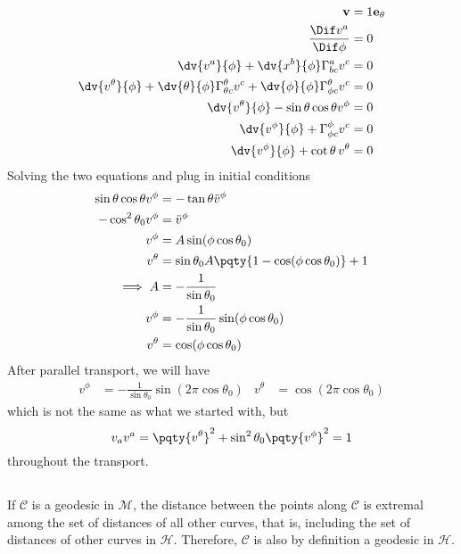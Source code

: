 \documentclass[12pt]{article}
\begin{document}
    \subsubsection{} {
    \begin{align*}
        \bf v &=  1 \bf e_\theta\\
        \frac{\Dif v^a}{\Dif \phi} &=  0\\
        \dv{v^a}{\phi} + \dv{x^b}{\phi}\Gamma^{a}_{bc}v^c &=  0\\
        \dv{v^\theta }{\phi} + \dv{\theta }{\phi}\Gamma^{\theta}_{\theta c}v^c + \dv{\phi }{\phi}\Gamma^{\theta }_{\phi c}v^c &=  0\\
        \dv{v^\theta }{\phi} - \sin\theta \cos\theta v^\phi  &=  0\\
        \dv{v^\phi }{\phi}+ \Gamma^{\phi }_{\phi c}v^c &=  0\\
        \dv{v^\phi}{\phi} + \cot \theta\, v^\theta   &=  0
    \end{align*}}
    Solving the two equations and plug in initial conditions \begin{align*}
        \sin\theta \cos\theta v^\phi &= - \tan\theta \ddot{v}^\phi \\
        -\cos^2\theta_0 v^\phi &= \ddot{v}^\phi \\
        v^\phi &= A \sin(\phi \cos\theta_0)\\
        {v^\theta } &= \sin\theta_0 A\pqty{1 -\cos(\phi \cos\theta_0)}  + 1 \\
        \implies A &= - \frac{1}{\sin\theta_0}\\
        v^\phi &= -\frac{1}{\sin\theta_0} \sin(\phi \cos\theta_0)\\
        {v^\theta } &= \cos(\phi \cos\theta_0)
    \end{align*}
    After parallel transport, we will have \begin{align*}
        v^\phi &= -\frac{1}{\sin\theta_0} \sin(2\pi \cos\theta_0)&
        {v^\theta } &= \cos(2\pi\cos\theta_0)
    \end{align*}
    which is not the same as what we started with, but \[
        v_a v^a =\pqty{v^\theta  }^2 + \sin^2\theta_0\pqty{v^\phi }^2 = 1
     \]
    throughout the transport.
    \subsection{} If \(\mathcal C\) is a geodesic in \(\mathcal M\), the distance between the points along \(\mathcal{C}\) is extremal among the set of distances of all other curves, that is, including the set of distances of other curves in \(\mathcal H\). Therefore, \(\mathcal C\) is also by definition a geodesic in \(\mathcal{H}\).
\end{document}
